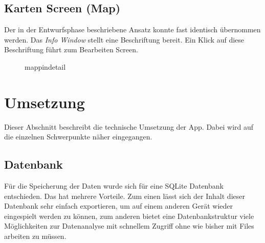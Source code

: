 \documentclass[
    DIV12,
    cleardouble=plain,
    headings=normal,
    pdftex,
    headexclude,footexclude,
    final
]{scrreprt}
\begin{document}
\section{Karten Screen (Map)}
Der in der Entwurfsphase beschriebene Ansatz konnte fast identisch übernommen werden. Das \textit{Info Window} stellt eine Beschriftung bereit. Ein Klick auf diese Beschriftung führt zum Bearbeiten Screen.

\begin{figure}[H]
	\centering
	\caption{mappindetail}
	\label{Map mit Pin und Beschriftung}
\end{figure}



\chapter{Umsetzung}
Dieser Abschnitt beschreibt die technische Umsetzung der App. Dabei wird auf die einzelnen Schwerpunkte näher eingegangen.
\section{Datenbank}
	Für die Speicherung der Daten wurde sich für eine SQLite Datenbank entschieden. Das hat mehrere Vorteile. Zum einen lässt sich der Inhalt dieser Datenbank sehr einfach exportieren, um auf einem anderen Gerät wieder eingespielt werden zu können, zum anderen bietet eine Datenbankstruktur viele Möglichkeiten zur Datenanalyse mit schnellem Zugriff ohne wie bisher mit Files arbeiten zu müssen.
\end{document}
